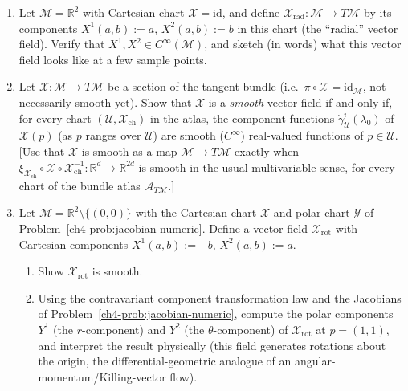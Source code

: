 \documentclass[11pt]{article}
\newcommand{\Cinf}{C^\infty(\mathcal M)}
\begin{document}
\begin{enumerate}[label=\textbf{5.\arabic*}, leftmargin=2.2cm, start=1]

\item \label{prob:radial-field}
Let $\mathcal M=\mathbb R^2$ with Cartesian chart $\mathcal X=\mathrm{id}$,
and define $\mathcal X_{\mathrm{rad}}:\mathcal M\to T\mathcal M$ by its
components $X^1(a,b):=a$, $X^2(a,b):=b$ in this chart (the ``radial''
vector field). Verify that $X^1,X^2\in\Cinf$, and sketch (in words) what
this vector field looks like at a few sample points.

\item \label{prob:smooth-section-iff-smooth-components}
Let $\mathcal X:\mathcal M\to T\mathcal M$ be a section of the tangent
bundle (i.e.\ $\pi\circ\mathcal X=\mathrm{id}_{\mathcal M}$, not
necessarily smooth yet). Show that $\mathcal X$ is a \emph{smooth} vector
field if and only if, for every chart $(\mathcal U,\mathcal X_{\mathrm{ch}})$
in the atlas, the component functions $\dot\gamma^i_{\mathcal
U}(\lambda_0)$ of $\mathcal X(p)$ (as $p$ ranges over $\mathcal U$) are
smooth ($C^\infty$) real-valued functions of $p\in\mathcal U$. [Use that
$\mathcal X$ is smooth as a map $\mathcal M\to T\mathcal M$ exactly when
$\xi_{\mathcal X_{\mathrm{ch}}}\circ\mathcal X\circ\mathcal
X_{\mathrm{ch}}^{-1}:\mathbb R^d\to\mathbb R^{2d}$ is smooth in the usual
multivariable sense, for every chart of the bundle atlas
$\mathcal A_{T\mathcal M}$.]

\item \label{prob:rotation-field}
Let $\mathcal M=\mathbb R^2\setminus\{(0,0)\}$ with the Cartesian chart
$\mathcal X$ and polar chart $\mathcal Y$ of
Problem~\ref{ch4-prob:jacobian-numeric}. Define a vector field $\mathcal
X_{\mathrm{rot}}$ with Cartesian components $X^1(a,b):=-b$, $X^2(a,b):=a$.
\begin{enumerate}[label=(\alph*)]
  \item Show $\mathcal X_{\mathrm{rot}}$ is smooth.
  \item Using the contravariant component transformation law and the
  Jacobians of Problem~\ref{ch4-prob:jacobian-numeric}, compute the polar
  components $Y^1$ (the $r$-component) and $Y^2$ (the $\theta$-component)
  of $\mathcal X_{\mathrm{rot}}$ at $p=(1,1)$, and interpret the result
  physically (this field generates rotations about the origin, the
  differential-geometric analogue of an angular-momentum/Killing-vector
  flow).
\end{enumerate}

\end{enumerate}
\end{document}
